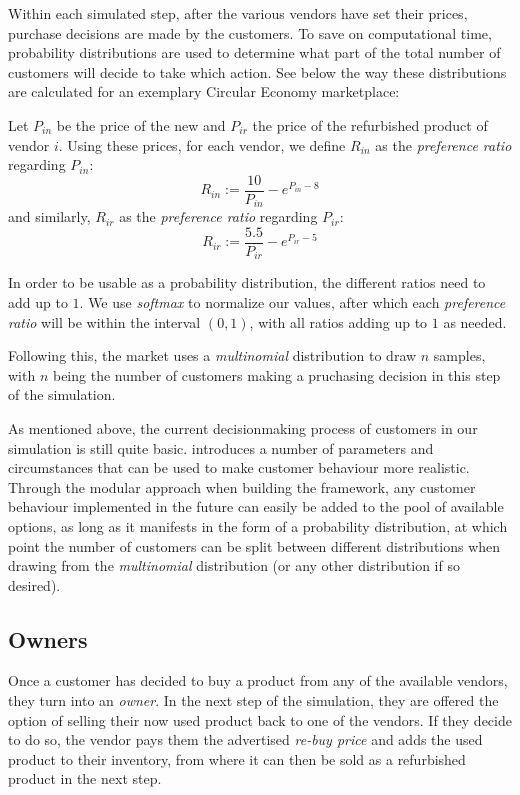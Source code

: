 Within each simulated step, after the various vendors have set their prices, purchase decisions are made by the customers. To save on computational time, probability distributions are used to determine what part of the total number of customers will decide to take which action. See below the way these distributions are calculated for an exemplary Circular Economy marketplace:

\begin{definition}\label{def:customerDecisions}
	Let \(P_{in}\) be the price of the new and \(P_{ir}\) the price of the refurbished product of vendor \(i\). Using these prices, for each vendor, we define \(R_{in}\) as the \emph{preference ratio} regarding \(P_{in}\):
	\[
		R_{in} := \frac{10}{P_{in}} - e^{P_{in} - 8}
	\]
	and similarly, \(R_{ir}\) as the \emph{preference ratio} regarding \(P_{ir}\):
	\[
		R_{ir} := \frac{5.5}{P_{ir}} - e^{P_{ir} - 5}
	\]
\end{definition}

In order to be usable as a probability distribution, the different ratios need to add up to \(1\). We use \emph{softmax} to normalize our values, after which each \emph{preference ratio} will be within the interval \((0,1)\), with all ratios adding up to \(1\) as needed.

Following this, the market uses a \emph{multinomial} distribution to draw \(n\) samples, with \(n\) being the number of customers making a pruchasing decision in this step of the simulation.

As mentioned above, the current decisionmaking process of customers in our simulation is still quite basic.  introduces a number of parameters and circumstances that can be used to make customer behaviour more realistic. Through the modular approach when building the framework, any customer behaviour implemented in the future can easily be added to the pool of available options, as long as it manifests in the form of a probability distribution, at which point the number of customers can be split between different distributions when drawing from the \emph{multinomial} distribution (or any other distribution if so desired).

\subsection*{Owners}

Once a customer has decided to buy a product from any of the available vendors, they turn into an \emph{owner}. In the next step of the simulation, they are offered the option of selling their now used product back to one of the vendors. If they decide to do so, the vendor pays them the advertised \emph{re-buy price} and adds the used product to their inventory, from where it can then be sold as a refurbished product in the next step.

